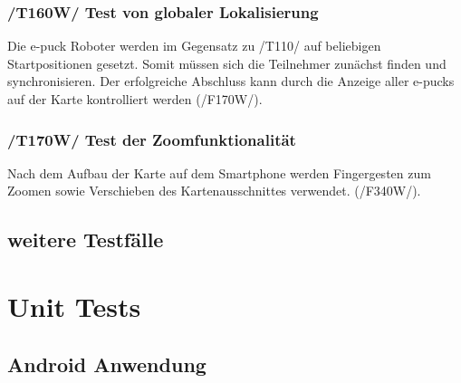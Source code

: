 \documentclass[10pt,a4paper]{article}
\begin{document}
			\subsubsection{/T160W/ Test von globaler Lokalisierung}
			Die e-puck Roboter werden im Gegensatz zu /T110/ auf beliebigen Startpositionen gesetzt. Somit müssen
			sich die Teilnehmer zunächst finden und synchronisieren. Der erfolgreiche Abschluss kann durch die Anzeige aller e-pucks
			auf der Karte kontrolliert werden (/F170W/).
			
			\subsubsection{/T170W/ Test der Zoomfunktionalität}
			Nach dem Aufbau der Karte auf dem Smartphone werden Fingergesten zum Zoomen sowie Verschieben des
			Kartenausschnittes verwendet. (/F340W/). 

		
		\subsection{weitere Testfälle}
	
	
	\section{Unit Tests}
		\subsection{Android Anwendung}
		
\end{document}
